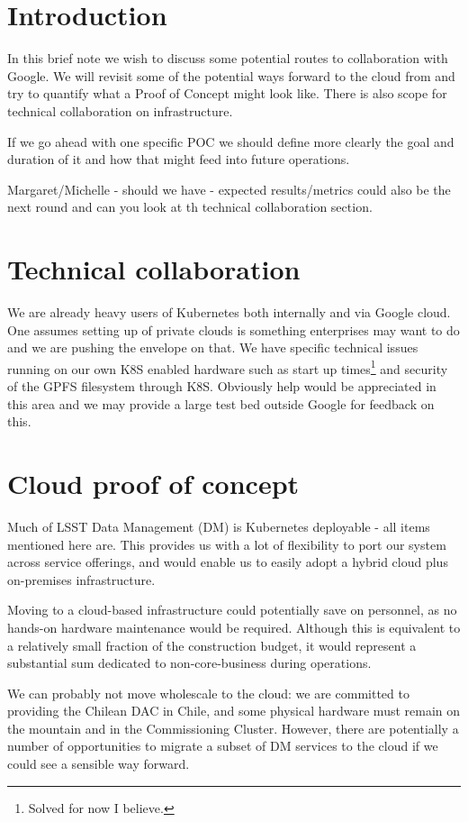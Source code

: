 
\section{Introduction}
In this brief note we wish to discuss some potential routes to collaboration with Google. We will revisit some of the potential ways forward to the cloud from  and try to quantify what a Proof of Concept might look like. There is also scope for technical collaboration on infrastructure.

If we go ahead with one specific POC we should define more clearly the goal and duration of it and how that might feed into future operations.

{\color{red} Margaret/Michelle - should we have - expected results/metrics could also be the next round and can you look at th technical collaboration section. }
\section{Technical collaboration}
We are already heavy users of Kubernetes both internally and via Google cloud.  One assumes setting up of private clouds is something enterprises may want to do and we are pushing the envelope on that. We have specific technical issues running on our own K8S enabled hardware such as start up times\footnote{Solved for now I believe.} and security of the GPFS filesystem through K8S. Obviously help would be appreciated in this area and we may provide a large test bed outside Google for feedback on this.

\section{Cloud proof of concept}\label{sect:pocs}

Much of LSST Data Management (DM) is  Kubernetes deployable - all items mentioned here are.
This provides us with a lot of flexibility to port our system across service offerings, and would enable us to easily adopt a hybrid cloud plus on-premises infrastructure.

Moving to a cloud-based infrastructure could potentially  save on personnel, as no hands-on hardware maintenance would be required.
Although this is equivalent to a relatively small fraction of the construction budget, it would represent a substantial sum dedicated to non-core-business during operations.

We can probably not move wholescale to the cloud:
we are committed to providing the Chilean DAC in Chile, and some physical hardware must remain on the mountain and in the Commissioning Cluster.
However, there are potentially a number of opportunities to migrate a subset of DM services to the cloud if we could see a sensible way forward.

